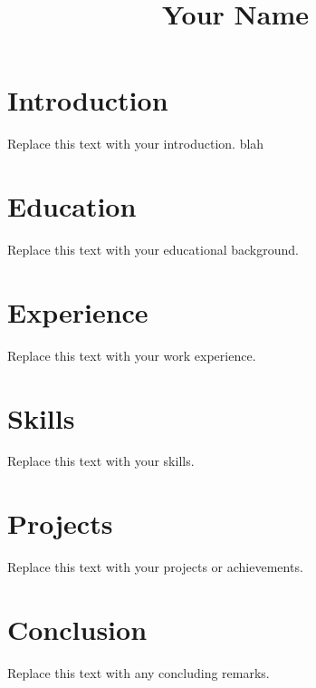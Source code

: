 \documentclass{article}
\begin{document}
\title{Your Name}
\author{}
\date{}

\maketitle

\section{Introduction}
Replace this text with your introduction. blah

\section{Education}
Replace this text with your educational background.

\section{Experience}
Replace this text with your work experience.

\section{Skills}
Replace this text with your skills.

\section{Projects}
Replace this text with your projects or achievements.

\section{Conclusion}
Replace this text with any concluding remarks.
\end{document}
